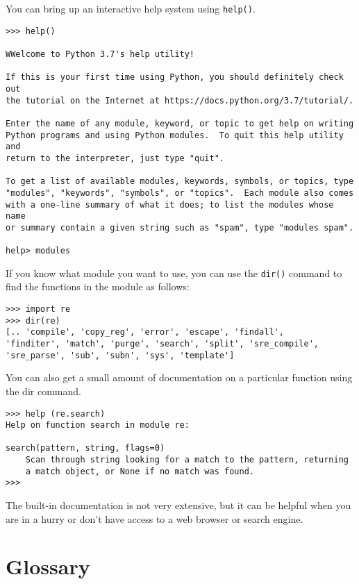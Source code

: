 You can bring up an interactive help system using {\tt help()}.

\beforeverb
\begin{verbatim}
>>> help()

WWelcome to Python 3.7's help utility!

If this is your first time using Python, you should definitely check out
the tutorial on the Internet at https://docs.python.org/3.7/tutorial/.

Enter the name of any module, keyword, or topic to get help on writing
Python programs and using Python modules.  To quit this help utility and
return to the interpreter, just type "quit".

To get a list of available modules, keywords, symbols, or topics, type
"modules", "keywords", "symbols", or "topics".  Each module also comes
with a one-line summary of what it does; to list the modules whose name
or summary contain a given string such as "spam", type "modules spam".

help> modules
\end{verbatim}
\afterverb
%
If you know what module you want to use, you can use the {\tt dir()} command to find the functions in the module as follows:

\beforeverb
\begin{verbatim}
>>> import re
>>> dir(re)
[.. 'compile', 'copy_reg', 'error', 'escape', 'findall', 
'finditer', 'match', 'purge', 'search', 'split', 'sre_compile', 
'sre_parse', 'sub', 'subn', 'sys', 'template']
\end{verbatim}
\afterverb
%
You can also get a small amount of documentation on a particular function using the dir command.

\beforeverb
\begin{verbatim}
>>> help (re.search)
Help on function search in module re:

search(pattern, string, flags=0)
    Scan through string looking for a match to the pattern, returning
    a match object, or None if no match was found.
>>> 
\end{verbatim}
\afterverb
%
The built-in documentation is not very extensive, but it can be helpful when you are in a hurry
or don't have access to a web browser or search engine.

\section{Glossary}

